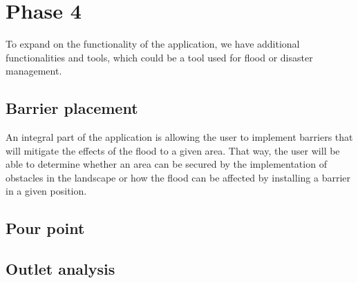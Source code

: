 \section{Phase 4}
To expand on the functionality of the application, we have additional functionalities and tools, which could be a tool used for flood or disaster management. 

\subsection{Barrier placement}
An integral part of the application is allowing the user to implement barriers that will mitigate the effects of the flood to a given area. That way, the user will be able to determine whether an area can be secured by the implementation of obstacles in the landscape or how the flood can be affected by installing a barrier in a given position.\\



\subsection{Pour point}

\subsection{Outlet analysis}


